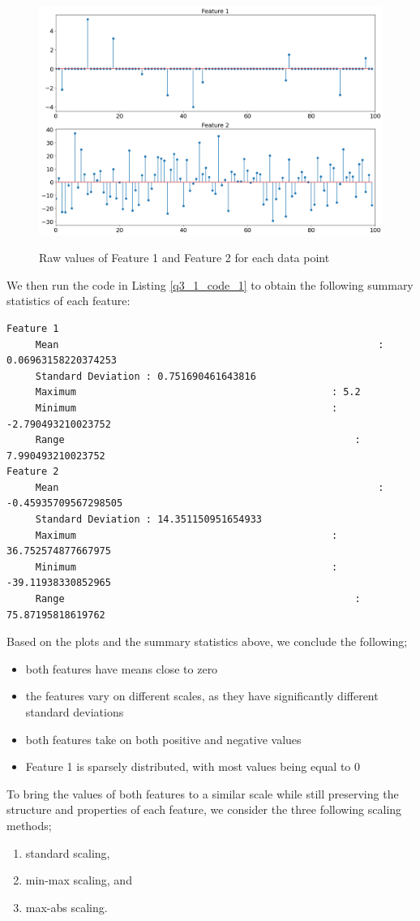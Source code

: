 \documentclass{article}[a4paper]
\begin{document}
	\begin{figure}[H]
		\centering
		\includegraphics[width=\linewidth]{images/q3_1_1.png}
		\label{q3_1_1_img}
		\caption{Raw values of Feature 1 and Feature 2 for each data point}
	\end{figure}

	We then run the code in Listing \ref{q3_1_code_1} to obtain the following summary statistics of each feature:
	\begin{verbatim}
Feature 1
	 Mean 														: 0.06963158220374253
	 Standard Deviation : 0.751690461643816
	 Maximum 											: 5.2
	 Minimum 											: -2.790493210023752
	 Range 													: 7.990493210023752
Feature 2
	 Mean 														: -0.45935709567298505
	 Standard Deviation : 14.351150951654933
	 Maximum 											: 36.752574877667975
	 Minimum 											: -39.11938330852965
	 Range 													: 75.87195818619762
	\end{verbatim}

	Based on the plots and the summary statistics above, we conclude the following;
	\begin{itemize}[itemsep=1pt]
		\item both features have means close to zero
		\item the features vary on different scales, as they have significantly different standard deviations
		\item both features take on both positive and negative values
		\item Feature 1 is sparsely distributed, with most values being equal to 0
	\end{itemize}

	To bring the values of both features to a similar scale while still preserving the structure and properties of
	each feature, we consider the three following scaling methods;
	\begin{enumerate}[itemsep=1pt]
		\item standard scaling,
		\item min-max scaling, and
		\item max-abs scaling.
	\end{enumerate}
	
\end{document}
